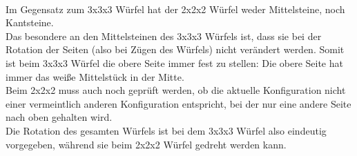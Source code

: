 \documentclass[12pt,a4paper, usenames, dvipsnames]{scrartcl}
\begin{document}
\newpage
$\ $\\
Im Gegensatz zum 3x3x3 Würfel hat der 2x2x2 Würfel weder Mittelsteine, noch Kantsteine. \\
Das besondere an den Mittelsteinen des 3x3x3 Würfels ist, dass sie bei der Rotation der Seiten (also bei Zügen des Würfels) nicht verändert werden. Somit ist beim 3x3x3 Würfel die obere Seite immer fest zu stellen: Die obere Seite hat immer das weiße Mittelstück in der Mitte. \\
Beim 2x2x2 muss auch noch geprüft werden, ob die aktuelle Konfiguration nicht einer vermeintlich anderen Konfiguration entspricht, bei der nur eine andere Seite nach oben gehalten wird. \\
Die Rotation des gesamten Würfels ist bei dem 3x3x3 Würfel also eindeutig vorgegeben, während sie beim 2x2x2 Würfel gedreht werden kann. \\
\\


\newpage










\end{document}

